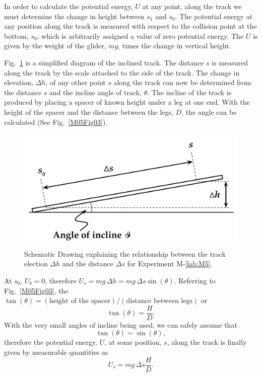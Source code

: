 In order to calculate the potential energy, $U$ at any point, along the track we must determine the change in height between $s_1$ and $s_0$.  The potential energy at any position along the track is measured with respect to the collision point at the bottom, $s_0$, which is arbitrarily assigned a value of zero potential energy.  The $U$ is given by the weight of the glider, $mg$, times the change in vertical height.

Fig.~\ref{M05Fig02} is a simplified diagram of the inclined track. The distance $s$ is measured along the track by the scale attached to the side of the track.  The change in elevation, $\Delta h$, of any other point $s$ along the track can now be determined from the distance $s$ and the incline angle of track, $\theta$.  The incline of the track is produced by placing a spacer of known height under a leg at one end.  With the height of the spacer and the distance between the legs, $D$, the angle can be calculated (See Fig.~\ref{M05Fig03}).

\begin{figure}
  \begin{center}
    \includegraphics[width=4.5in]{Experiment04Figures/Figure02.pdf}
  \end{center}
  \caption{Schematic Drawing explaining the relationship between the track election $\Delta h$ and the distance $\Delta s$ for Experiment M-\ref{lab:M5}.}
  \label{M05Fig02}
\end{figure}

At $s_0$, $U_{b} = 0$, therefore $U_{s} = mg\, \Delta h = mg\, \Delta s \sin(\theta)$.
Referring to Fig.~\ref{M05Fig03}, the $\tan(\theta) = (\mbox{height of the spacer}) / (\mbox{distance between legs})$ or
\[
\tan(\theta) = \frac{H}{D}.
\]
With the very small angles of incline being used, we can safely assume that
\[
\tan(\theta) \sim \sin(\theta),
\]
therefore the potential energy, $U$, at some position, $s$, along the track is finally given by measurable quantities as
\begin{equation}
  U_s = mg \, \Delta s \frac{H}{D}.
\end{equation}

